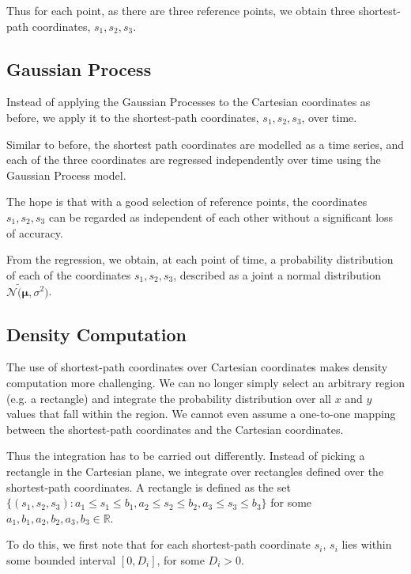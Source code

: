 \documentclass[letterpaper]{article}
\begin{document}
Thus for each point, as there are three reference points, we obtain three shortest-path coordinates, $s_1, s_2, s_3$.\\

\subsection{Gaussian Process}

Instead of applying the Gaussian Processes to the Cartesian coordinates as before, we apply it to the shortest-path coordinates, $s_1, s_2, s_3$, over time.

Similar to before, the shortest path coordinates are modelled as a time series, and each of the three coordinates are regressed independently over time using the Gaussian Process model.

The hope is that with a good selection of reference points, the coordinates $s_1, s_2, s_3$ can be regarded as independent of each other without a significant loss of accuracy.

From the regression, we obtain, at each point of time, a probability distribution of each of the coordinates $s_1, s_2, s_3$, described as a joint a normal distribution $\mathcal{N}\tilde (\boldsymbol{\mu},\sigma^2)$.

\subsection{Density Computation}

The use of shortest-path coordinates over Cartesian coordinates makes density computation more challenging. We can no longer simply select an arbitrary region (e.g. a rectangle) and integrate the probability distribution over all $x$ and $y$ values that fall within the region. We cannot even assume a one-to-one mapping between the shortest-path coordinates and the Cartesian coordinates.

Thus the integration has to be carried out differently. Instead of picking a rectangle in the Cartesian plane, we integrate over rectangles defined over the shortest-path coordinates. A rectangle is defined as the set $\{(s_1,s_2,s_3) : a_1\leq s_1\leq b_1, a_2\leq s_2\leq b_2, a_3\leq s_3\leq b_3\}$ for some $a_1,b_1,a_2,b_2,a_3,b_3 \in \mathbb{R}$.

To do this, we first note that for each shortest-path coordinate $s_i$, $s_i$ lies within some bounded interval $[0,D_i]$, for some $D_i > 0$.
\end{document}
